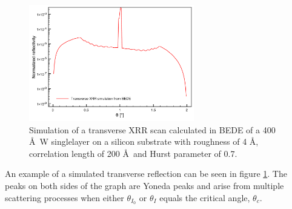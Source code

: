 \begin{figure}[!ht] %
	\centering
		\includegraphics[height=2in]{figures/xray_app/transverse.pdf}
	\caption{Simulation of a transverse XRR scan calculated in BEDE of a 400 \AA\ W singlelayer on a silicon substrate with roughness of 4 \AA, correlation length of 200 \AA\ and Hurst parameter of 0.7. }
	\label{fig:transverse}
\end{figure}

An example of a simulated transverse reflection can be seen in figure \ref{fig:transverse}. The peaks on both sides of the graph are Yoneda peaks\cite{Yoneda:1963tr} and arise from multiple scattering processes when either $\theta_{I_0}$ or $\theta_I$ equals the critical angle, $\theta_c$.
